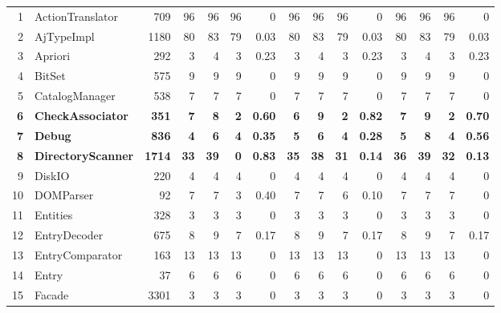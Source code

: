 \documentclass{acm_proc_article-sp}
\begin{document}
\begin{table} [htp!]
{\begin{tabularx}{1 \textwidth}{r l r r r r r r r r r r r r r}
1						& ActionTranslator			&709		& 96		&	96	&	96	& 	0					& 96		& 96 		& 96		& 		0			& 96			& 96			& 96			&	0\\     
2						& AjTypeImpl				&1180		& 80		&	83	&	79	& 	0.03					& 80		& 83 		& 79		& 		0.03			& 80			& 83			& 79			&	0.03\\      
3						& Apriori					&292		& 3		&	4	&	3	& 	0.23					& 3		& 4 		& 3		& 		0.23			& 3			& 4			& 3			&	0.23\\      
4						& BitSet					&575		& 9		&	9	&	9	& 	0					& 9		& 9 		& 9		& 		0			& 9			& 9			& 9			&	0\\       
5						& CatalogManager			&538		& 7		&	7	&	7	& 	0					& 7		& 7 		& 7		& 		0			& 7			& 7			& 7			&	0\\    
\textbf{6}					& \textbf{CheckAssociator}			&\textbf{351}		& \textbf{7}		&	\textbf{8}	&	\textbf{2}	& 	\textbf{0.60}					& \textbf{6}		& \textbf{9} 		& \textbf{2}		& 		\textbf{0.82}			& \textbf{7}			& \textbf{9}			& \textbf{2}			&	\textbf{0.70}\\    
\textbf{7}						& \textbf{Debug}					&\textbf{836}		& \textbf{4}		&	\textbf{6}	&	\textbf{4}	& 	\textbf{0.35}					& \textbf{5}		& \textbf{6} 		& \textbf{4}		& 		\textbf{0.28}			& \textbf{5}			& \textbf{8}			& \textbf{4}			&	\textbf{0.56}\\       
\textbf{8}						& \textbf{DirectoryScanner}			&\textbf{1714}		& \textbf{33}		&	\textbf{39}	&	\textbf{0}	& 	\textbf{0.83}					& \textbf{35}		& \textbf{38} 		& \textbf{31}		& 		\textbf{0.14}			& \textbf{36}			& \textbf{39}			& \textbf{32}			&	\textbf{0.13}\\      
9						& DiskIO					&220		& 4		&	4	&	4	& 	0					& 4		& 4 		& 4		& 		0			& 4			& 4			& 4			&	0\\      
10						& DOMParser				&92			& 7		&	7	&	3	& 	0.40					& 7		& 7 		& 6		& 		0.10			& 7			& 7			& 7			&	0\\      
11						& Entities					&328		& 3		&	3	&	3	& 	0					& 3		& 3 		& 3		& 		0			& 3			& 3			& 3			&	0\\      
12						& EntryDecoder			&675		& 8		&	9	&	7	& 	0.17					& 8		& 9 		& 7		& 		0.17			& 8			& 9			& 7			&	0.17\\   
13						& EntryComparator			&163		& 13		&	13	&	13	& 	0					& 13		& 13 		& 13		& 		0			& 13			& 13			& 13			&	0\\      
14						& Entry					&37			& 6		&	6	&	6	& 	0					& 6		& 6 		& 6		& 		0			& 6			& 6			& 6			&	0\\   
15						& Facade					&3301		& 3		&	3	&	3	& 	0					& 3		& 3 		& 3		& 		0			& 3			& 3			& 3			&	0\\   

\end{tabularx}}
\end{table}
\end{document}
